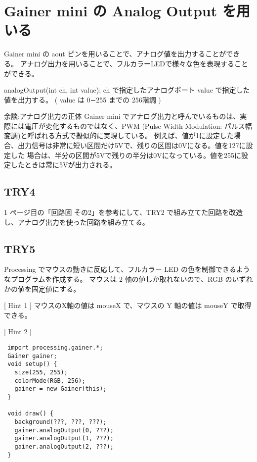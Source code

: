 \documentclass[11pt,a4paper]{jarticle}
\begin{document}
\section{Gainer mini の Analog Output を用いる}
Gainer mini の aout ピンを用いることで、アナログ値を出力することができる。
アナログ出力を用いることで、フルカラーLEDで様々な色を表現することができる。

analogOutput(int ch, int value);
ch で指定したアナログポート value で指定した値を出力する。
( value は 0∼255 までの 256階調 )

余談:アナログ出力の正体
 Gainer mini でアナログ出力と呼んでいるものは、実際には電圧が変化するものではなく、PWM (Pulse Width
Modulation: パルス幅変調)と呼ばれる方式で擬似的に実現している。
 例えば、値が1に設定した場合、出力信号は非常に短い区間だけ5Vで、残りの区間は0Vになる。値を127に設定した
場合は、半分の区間が5Vで残りの半分は0Vになっている。値を255に設定したときは常に5Vが出力される。

\subsection*{TRY4}
1 ページ目の「回路図 その2」を参考にして、TRY2 で組み立てた回路を改造し、アナログ出力を使った回路を組み立てる。

\subsection*{TRY5}
Processing でマウスの動きに反応して、フルカラー LED の色を制御できるようなプログラムを作成する。
マウスは 2 軸の値しか取れないので、RGB のいずれかの値を固定値にする。

[ Hint 1 ]
 マウスのX軸の値は mouseX で、マウスの Y 軸の値は mouseY で取得できる。
 
[ Hint 2 ]
\begin{lstlisting}
 import processing.gainer.*;
 Gainer gainer;
 void setup() {
   size(255, 255);
   colorMode(RGB, 256);
   gainer = new Gainer(this);
 }
 
 void draw() {
   background(???, ???, ???);
   gainer.analogOutput(0, ???);
   gainer.analogOutput(1, ???);
   gainer.analogOutput(2, ???);
 }
\end{lstlisting}
\end{document}
